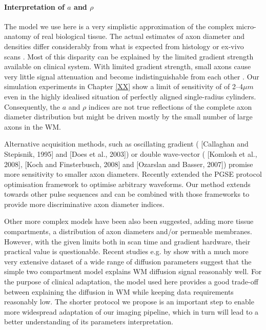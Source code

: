 \paragraph{Interpretation of $a$ and $\rho$}The model we use here is a very simplistic approximation of the complex micro-anatomy of real biological tissue. The actual estimates of axon diameter and densities differ considerably from what is expected from histology or ex-vivo scans \citep{Alexander:2010}. Most of this disparity can be explained by the limited gradient strength available on clinical system.  With limited gradient strength, small axons cause very little signal attenuation and become indistinguishable from each other \citep{Yeh:XXXX, Latt:YYYY}. Our simulation experiments in Chapter \ref{XX} show a limit of sensitivity of of 2--4$\mu m$ even in the highly idealised situation of perfectly aligned single-radius cylinders. Consequently, the $a$ and $\rho$ indices are not true reflections of the complete axon diameter distribution but might be driven mostly by the small number of large axons in the WM. 



Alternative acquisition methods, such as oscillating gradient ( [Callaghan and Stepisnik, 1995] and [Does et al., 2003]) or double wave-vector ( [Komlosh et al., 2008], [Koch and Finsterbusch, 2008] and [Ozarslan and Basser, 2007]) promise more sensitivity to smaller axon diameters. Recently \citet{Drobnjak:2009} extended the PGSE protocol optimisation framework to optimise arbitrary waveforms. Our method extends towards other pulse sequences and can be combined with those frameworks to provide more discriminative axon diameter indices.


Other more complex models have been also been suggested, adding more tissue compartments, a distribution of axon diameters and/or permeable membranes. However, with the given limits both in scan time and gradient hardware, their practical value is questionable. Recent studies e.g. by \citet{Panagiotaki:2011; Uran:2012} show with a much more very extensive dataset of a wide range of diffusion parameters suggest that the simple two compartment model explains WM diffusion signal reasonably well. For the purpose of clinical adaptation, the model used here provides a good trade-off between explaining the diffusion in WM while keeping data requirements reasonably low. The shorter protocol we propose is an important step to enable more widespread adaptation of our imaging pipeline, which in turn will lead to a better understanding of its parameters interpretation.


